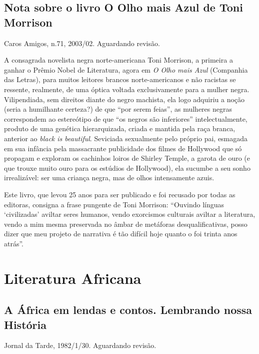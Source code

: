 \documentclass[
  letterpaper,
  DIV=11,
  numbers=noendperiod]{scrreprt}
\begin{document}
\chapter{Nota sobre o livro O Olho mais Azul de Toni
Morrison}\label{nota-sobre-o-livro-o-olho-mais-azul-de-toni-morrison}

Caros Amigos, n.71, 2003/02. Aguardando revisão.

\hfill\break

A consagrada novelista negra norte-americana Toni Morrison, a primeira a
ganhar o Prêmio Nobel de Literatura, agora em \emph{O Olho mais Azul}
(Companhia das Letras), para muitos leitores brancos norte-americanos e
não racistas se ressente, realmente, de uma óptica voltada
exclusivamente para a mulher negra. Vilipendiada, sem direitos diante do
negro machista, ela logo adquiriu a noção (seria a humilhante certeza?)
de que ``por serem feias'', as mulheres negras correspondem ao
estereótipo de que ``os negros são inferiores'' intelectualmente,
produto de uma genética hierarquizada, criada e mantida pela raça
branca, anterior ao \emph{black is beautiful}. Seviciada sexualmente
pelo próprio pai, esmagada em sua infância pela massacrante publicidade
dos filmes de Hollywood que só propagam e exploram os cachinhos loiros
de Shirley Temple, a garota de ouro (e que trouxe muito ouro para os
estúdios de Hollywood), ela sucumbe a seu sonho irrealizável: ser uma
criança negra, mas de olhos intensamente azuis.

Este livro, que levou 25 anos para ser publicado e foi recusado por
todas as editoras, consigna a frase pungente de Toni Morrison: ``Ouvindo
línguas `civilizadas' aviltar seres humanos, vendo exorcismos culturais
aviltar a literatura, vendo a mim mesma preservada no âmbar de metáforas
desqualificativas, posso dizer que meu projeto de narrativa é tão
difícil hoje quanto o foi trinta anos atrás''.

\part{Literatura Africana}

\chapter{A África em lendas e contos. Lembrando nossa
História}\label{a-uxe1frica-em-lendas-e-contos.-lembrando-nossa-histuxf3ria}

Jornal da Tarde, 1982/1/30. Aguardando revisão.
\end{document}
